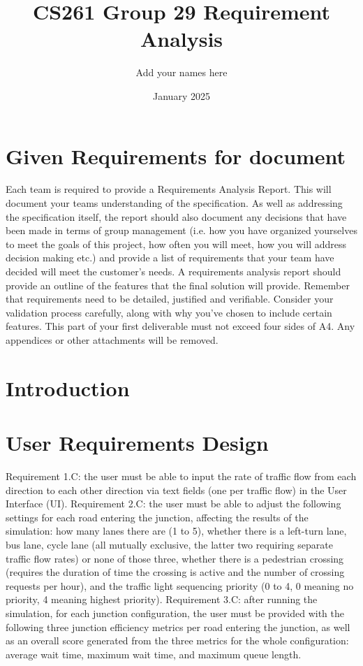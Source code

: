 \documentclass{article}
\title{CS261 Group 29 Requirement Analysis}
\author{Add your names here}
\date{January 2025}
\begin{document}
\maketitle
\tableofcontents

\section{Given Requirements for document}
Each team is required to provide a Requirements Analysis Report. This will document your teams understanding of the specification. As well as addressing the specification itself, the report should also document any decisions that have been made in terms of group management (i.e. how you have organized yourselves to meet the goals of this project, how often you will meet, how you will address decision making etc.) and provide a list of requirements that your team have decided will meet the customer's needs.
A requirements analysis report should provide an outline of the features that the final solution will provide. Remember that requirements need to be detailed, justified and verifiable. Consider your validation process carefully, along with why you've chosen to include certain features.
This part of your first deliverable must not exceed four sides of A4. Any appendices or other attachments will be removed.

\section{Introduction}

\section{User Requirements Design}
Requirement 1.C: the user must be able to input the rate of traffic flow from each direction to each other direction via text fields (one per traffic flow) in the User Interface (UI).
Requirement 2.C: the user must be able to adjust the following settings for each road entering the junction, affecting the results of the simulation: how many lanes there are (1 to 5), whether there is a left-turn lane, bus lane, cycle lane (all mutually exclusive, the latter two requiring separate traffic flow rates) or none of those three, whether there is a pedestrian crossing (requires the duration of time the crossing is active and the number of crossing requests per hour), and the traffic light sequencing priority (0 to 4, 0 meaning no priority, 4 meaning highest priority).
Requirement 3.C: after running the simulation, for each junction configuration, the user must be provided with the following three junction efficiency metrics per road entering the junction, as well as an overall score generated from the three metrics for the whole configuration: average wait time, maximum wait time, and maximum queue length.
\end{document}
